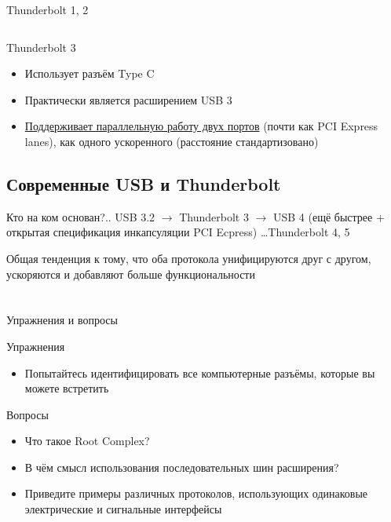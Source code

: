 \documentclass[xetex,aspectratio=43]{beamer}
\begin{document}
\begin{frame}{Thunderbolt 1, 2}
\begin{columns}
\begin{column}{0.5\textwidth}
        \end{column}
    \end{columns}
\end{frame}

\begin{frame}{Thunderbolt 3}
    \begin{itemize}
        \item Использует разъём Type C
        \item Практически является расширением USB 3
        \item \href{https://market.yandex.ru/product--usb-kontsentrator-baseus-thunderbolt-c-pro-cahub-l0g-razemov-5/424956176}{Поддерживает параллельную работу двух портов} (почти как PCI Express lanes), как одного ускоренного (расстояние стандартизовано)
    \end{itemize}
\end{frame}

\subsection{Современные USB и Thunderbolt}

\begin{frame}{Кто на ком основан?..}
    USB 3.2 $\rightarrow$ Thunderbolt 3 $\rightarrow$ USB 4 (ещё быстрее + открытая спецификация инкапсуляции PCI Ecpress)  \ldots Thunderbolt 4, 5

    Общая тенденция к тому, что оба протокола унифицируются друг с другом, ускоряются и добавляют больше функциональности
\end{frame}

\section*{}

\begin{frame}{Упражнения и вопросы}
	\begin{block}{Упражнения}
		\begin{itemize}
			\tightlist
			\item
			Попытайтесь идентифицировать все компьютерные разъёмы, которые вы можете встретить
		\end{itemize}
	\end{block}

	\begin{block}{Вопросы}
		\begin{itemize}
			\tightlist
            \item
            Что такое Root Complex?
            \item
            В чём смысл использования последовательных шин расширения?
            \item
            Приведите примеры различных протоколов, использующих одинаковые электрические и сигнальные интерфейсы
		\end{itemize}
	\end{block}
\end{frame}

\postamble
\end{document}
